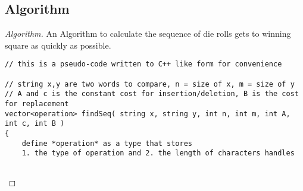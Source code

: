 \documentclass[openany]{article}
\begin{document}
\subsection*{Algorithm}
\begin{proof}[Algorithm]{}
		\renewcommand{\qedsymbol}{}
		An Algorithm to calculate the sequence of die rolls gets to winning square as quickly as possible.
		\begin{lstlisting}[basicstyle=\fontsize{8}{9}\selectfont\ttfamily]
// this is a pseudo-code written to C++ like form for convenience

// string x,y are two words to compare, n = size of x, m = size of y
// A and c is the constant cost for insertion/deletion, B is the cost for replacement
vector<operation> findSeq( string x, string y, int n, int m, int A, int c, int B )
{
    define *operation* as a type that stores
    1. the type of operation and 2. the length of characters handles
    

\end{lstlisting}
\end{proof}
\end{document}
